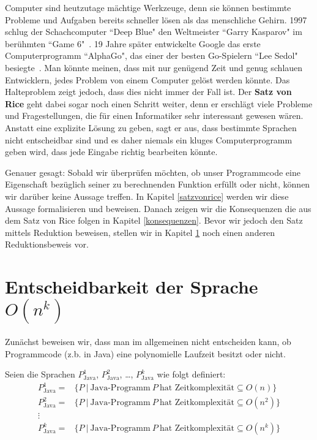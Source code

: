 \documentclass[journal]{IEEEtran}
\begin{document}
Computer sind heutzutage mächtige Werkzeuge, denn sie können bestimmte Probleme und Aufgaben bereits schneller lösen als das menschliche Gehirn. 1997 schlug der Schachcomputer ``Deep Blue" den Weltmeister ``Garry Kasparov" im berühmten ``Game 6"~\cite{ibmdeepblue}. 19 Jahre später entwickelte Google das erste Computerprogramm ``AlphaGo", das einer der besten Go-Spielern ``Lee Sedol" besiegte~\cite{googlealphago}. Man könnte meinen, dass mit nur genügend Zeit und genug schlauen Entwicklern, jedes Problem von einem Computer gelöst werden könnte. Das Halteproblem zeigt jedoch, dass dies nicht immer der Fall ist. Der \textbf{Satz von Rice} geht dabei sogar noch einen Schritt weiter, denn er erschlägt viele Probleme und Fragestellungen, die für einen Informatiker sehr interessant gewesen wären. Anstatt eine explizite Lösung zu geben, sagt er aus, dass bestimmte Sprachen nicht entscheidbar sind und es daher niemals ein kluges Computerprogramm geben wird, dass jede Eingabe richtig bearbeiten könnte.

Genauer gesagt: Sobald wir überprüfen möchten, ob unser Programmcode eine Eigenschaft bezüglich seiner zu berechnenden Funktion erfüllt oder nicht, können wir darüber keine Aussage treffen. In Kapitel \ref{satzvonrice} werden wir diese Aussage formalisieren und beweisen. Danach zeigen wir die Konsequenzen die aus dem Satz von Rice folgen in Kapitel \ref{konsequenzen}. Bevor wir jedoch den Satz mittels Reduktion beweisen, stellen wir in Kapitel \ref{entscheidbarkeitovonn} noch einen anderen Reduktionsbeweis vor.

\section{Entscheidbarkeit der Sprache $O(n^k)$}
\label{entscheidbarkeitovonn}

Zunächst beweisen wir, dass man im allgemeinen nicht entscheiden kann, ob Programmcode (z.b. in Java) eine polynomielle Laufzeit besitzt oder nicht.

\begin{definition}
Seien die Sprachen $P_\text{Java}^1$, $P_\text{Java}^2$, \dots, $P_\text{Java}^k$ wie folgt definiert:
\begin{align*}
P_\text{Java}^1 =& \{ P \ \vert \ \text{Java-Programm} \  P \ \text{hat Zeitkomplexit\"at} \subseteq O(n) \} \\
P_\text{Java}^2 =& \{ P \ \vert \ \text{Java-Programm} \  P \ \text{hat Zeitkomplexit\"at} \subseteq O(n^2) \} \\
\vdots \\
P_\text{Java}^k =& \{ P \ \vert \ \text{Java-Programm} \  P \ \text{hat Zeitkomplexit\"at} \subseteq O(n^k) \}
\end{align*}
\end{definition}
\end{document}
